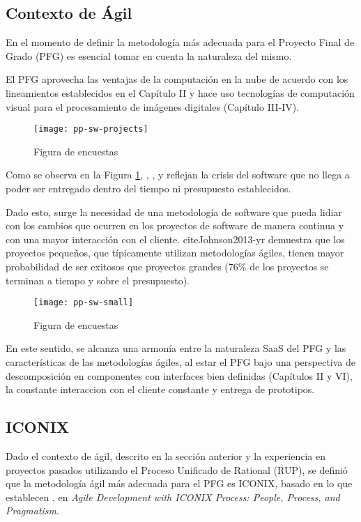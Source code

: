 \subsection{Contexto de Ágil}
En el momento de definir la metodología más adecuada para el Proyecto Final de Grado (PFG) es esencial tomar en cuenta la naturaleza del mismo.

El PFG aprovecha las ventajas de la computación en la nube de acuerdo con los lineamientos establecidos en el Capítulo II y hace uso tecnologías de computación visual para el procesamiento de imágenes digitales (Capítulo III-IV). 

    \begin{figure}[H]
        \centering
        \texttt{[image: pp-sw-projects]}
        \caption{Figura de encuestas \protect\cite{Fox2013-ct}}
        \label{fig:pp-sw-projects}
    \end{figure}

Como se observa en la Figura \ref{fig:pp-sw-projects}, , ,  y  reflejan la crisis del software que no llega a poder ser entregado dentro del tiempo ni presupuesto establecidos. 

Dado esto, surge la necesidad de una metodología de software que pueda lidiar con los cambios que ocurren en los proyectos de software de manera continua y con una mayor interacción con el cliente. cite{Johnson2013-yr} demuestra que los proyectos pequeños, que típicamente utilizan metodologías ágiles, tienen mayor probabilidad de ser exitosos que proyectos grandes (76\% de los proyectos se terminan a tiempo y sobre el presupuesto). 
    
    \begin{figure}[H]
            \centering
            \texttt{[image: pp-sw-small]}
            \caption{Figura de encuestas \protect\cite{Fox2013-ct}}
            \label{fig:pp-sw-small}
        \end{figure}

En este sentido, se alcanza una armonía entre la naturaleza SaaS del PFG y las características de las metodologías ágiles, al estar el PFG  bajo una perspectiva de descomposición en componentes con interfaces bien definidas (Capítulos II y VI), la constante interaccion con el cliente constante y entrega de prototipos.

\subsection{ICONIX}
Dado el contexto de ágil, descrito en la sección anterior y la experiencia en proyectos pasados utilizando el Proceso Unificado de Rational (RUP), se definió que la metodología ágil más adecuada para el PFG es ICONIX, basado en lo que establecen , en \textit{Agile Development with ICONIX Process: People, Process, and Pragmatism}. 

